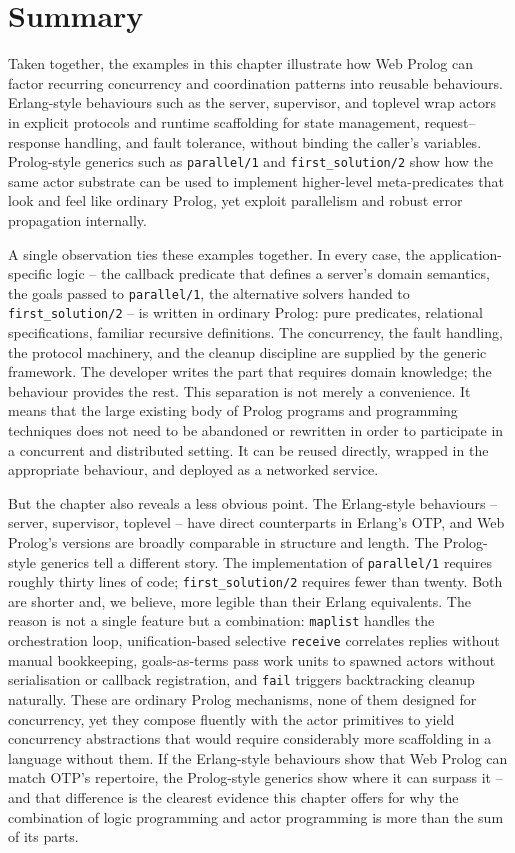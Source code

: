 \section{Summary}

Taken together, the examples in this chapter illustrate how Web Prolog can
factor recurring concurrency and coordination patterns into reusable
behaviours. Erlang-style behaviours such as the server, supervisor, and
toplevel wrap actors in explicit protocols and runtime scaffolding for state
management, request--response handling, and fault tolerance, without binding
the caller's variables. Prolog-style generics such as \texttt{parallel/1}
and \texttt{first\_solution/2} show how the same actor substrate can be
used to implement higher-level meta-predicates that look and feel like
ordinary Prolog, yet exploit parallelism and robust error propagation
internally.

A single observation ties these examples together. In every case, the
application-specific logic --  the callback predicate that defines a
server's domain semantics, the goals passed to \texttt{parallel/1}, the
alternative solvers handed to \texttt{first\_solution/2} --  is written in
ordinary Prolog: pure predicates, relational specifications, familiar
recursive definitions. The concurrency, the fault handling, the protocol
machinery, and the cleanup discipline are supplied by the generic framework.
The developer writes the part that requires domain knowledge; the behaviour
provides the rest. This separation is not merely a convenience. It means
that the large existing body of Prolog programs and programming techniques
does not need to be abandoned or rewritten in order to participate in a
concurrent and distributed setting. It can be reused directly, wrapped in
the appropriate behaviour, and deployed as a networked service.

But the chapter also reveals a less obvious point. The Erlang-style
behaviours --  server, supervisor, toplevel --  have direct counterparts in
Erlang's OTP, and Web Prolog's versions are broadly comparable in structure
and length. The Prolog-style generics tell a different story. The
implementation of \texttt{parallel/1} requires roughly thirty lines of
code; \texttt{first\_solution/2} requires fewer than twenty. Both are
shorter and, we believe, more legible than their Erlang equivalents. The
reason is not a single feature but a combination: \texttt{maplist} handles
the orchestration loop, unification-based selective \texttt{receive}
correlates replies without manual bookkeeping, goals-as-terms pass work
units to spawned actors without serialisation or callback registration, and
\texttt{fail} triggers backtracking cleanup naturally. These are ordinary
Prolog mechanisms, none of them designed for concurrency, yet they compose
fluently with the actor primitives to yield concurrency abstractions that
would require considerably more scaffolding in a language without them. If
the Erlang-style behaviours show that Web Prolog can match OTP's
repertoire, the Prolog-style generics show where it can surpass it --  and
that difference is the clearest evidence this chapter offers for why the
combination of logic programming and actor programming is more than the sum
of its parts.